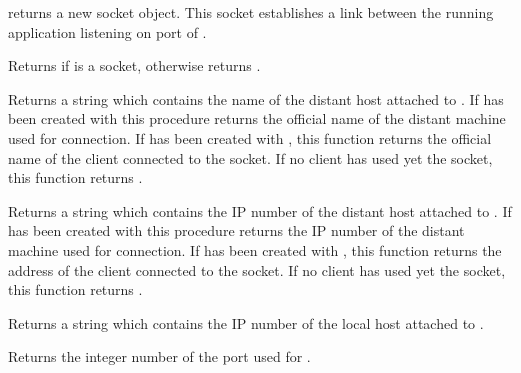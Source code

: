 \begin{entry}{
}
\saut
{} returns a new socket object. This socket
establishes a link between the running application listening on port
 of .
\end{entry}

\begin{entry}{
}
\saut
Returns \schtrue{} if  is a socket, otherwise returns
{\schfalse}.
\end{entry}

\begin{entry}{
}
\saut
Returns a string which contains the name of the distant host attached to  
. If  has been created with 
this procedure returns the official name of the distant machine used for 
connection. If  has been created with ,
this function returns the official name of the client connected to the socket. 
If no client has used yet the socket, this function returns \schfalse.
\end{entry}

\begin{entry}{
}
\saut
Returns a string which contains the IP number of
the distant host attached to . If  has been
created with  this procedure returns the
IP number of the distant machine used for connection. If
 has been created with , this
function returns the address of the client connected to the
socket.  If no client has used yet the socket, this function returns
\schfalse.
\end{entry}

\begin{entry}{
}
\saut
Returns a string which contains the IP number of
the local host attached to .
\end{entry}


\begin{entry}{
}
\saut
Returns the integer number of the port used for .
\end{entry}

